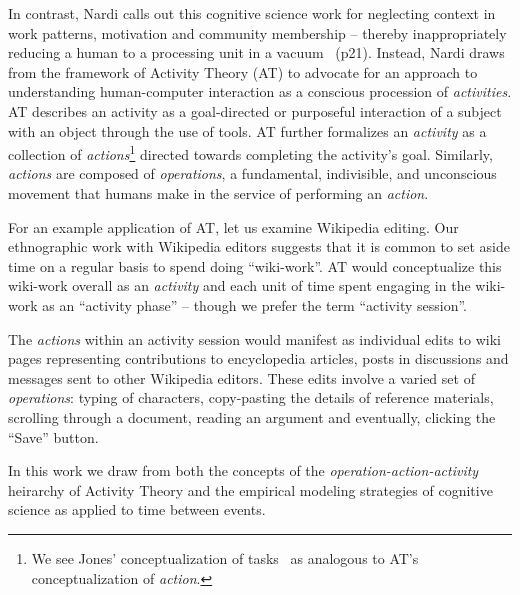 In contrast, Nardi calls out this cognitive science work for neglecting context in work patterns, motivation and community membership -- thereby inappropriately reducing a human to a processing unit in a vacuum~\cite{nardi1996context} (p21).  Instead, Nardi draws from the framework of Activity Theory (AT) to advocate for an approach to understanding human-computer interaction as a conscious procession of \emph{activities}.  AT describes an activity as a goal-directed or purposeful interaction of a subject with an object through the use of tools. AT further formalizes an \emph{activity} as a collection of \emph{actions}\footnote{We see Jones' conceptualization of tasks~\cite{jones2008beyond} as analogous to AT's conceptualization of \emph{action}.} directed towards completing the activity's goal.  Similarly, \emph{actions} are composed of \emph{operations}, a fundamental, indivisible, and unconscious movement that humans make in the service of performing an \emph{action}.

For an example application of AT, let us examine Wikipedia editing.  Our ethnographic work with Wikipedia editors suggests that it is common to set aside time on a regular basis to spend doing ``wiki-work''.  AT would conceptualize this wiki-work overall as an \emph{activity} and each unit of time spent engaging in the wiki-work as an ``activity phase'' -- though we prefer the term ``activity session''.

The \emph{actions} within an activity session would manifest as individual edits to wiki pages representing contributions to encyclopedia articles, posts in discussions and messages sent to other Wikipedia editors.  These edits involve a varied set of \emph{operations}: typing of characters, copy-pasting the details of reference materials, scrolling through a document, reading an argument and eventually, clicking the ``Save'' button.

In this work we draw from both the concepts of the \emph{operation-action-activity} heirarchy of Activity Theory and the empirical modeling strategies of cognitive science as applied to time between events.
